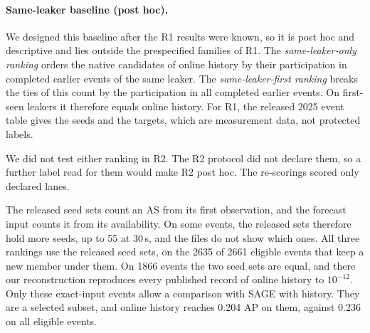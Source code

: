\paragraph{Same-leaker baseline (post hoc).}
We designed this baseline after the R1 results were known, so it is post hoc and descriptive and lies outside the prespecified families of R1.
The \emph{same-leaker-only ranking} orders the native candidates of online history by their participation in completed earlier events of the same leaker.
The \emph{same-leaker-first ranking} breaks the ties of this count by the participation in all completed earlier events.
On first-seen leakers it therefore equals online history.
For R1, the released 2025 event table gives the seeds and the targets, which are measurement data, not protected labels.

We did not test either ranking in R2.
The R2 protocol did not declare them, so a further label read for them would make R2 post hoc.
The re-scorings scored only declared lanes.

The released seed sets count an AS from its first observation, and the forecast input counts it from its availability.
On some events, the released sets therefore hold more seeds, up to 55 at 30\,s, and the files do not show which ones.
All three rankings use the released seed sets, on the \num{2635} of \num{2661} eligible events that keep a new member under them.
On \num{1866} events the two seed sets are equal, and there our reconstruction reproduces every published record of online history to $10^{-12}$.
Only these exact-input events allow a comparison with SAGE with history.
They are a selected subset, and online history reaches 0.204 AP on them, against 0.236 on all eligible events.

